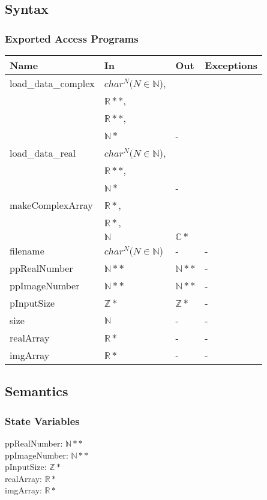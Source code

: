 \documentclass[12pt, titlepage]{article}
\begin{document}
\subsection{Syntax}

\subsubsection{Exported Access Programs}

\begin{center}
\begin{tabular}{p{3.5cm} p{4cm} p{4cm} p{2cm}}
\hline
\textbf{Name} & \textbf{In} & \textbf{Out} & \textbf{Exceptions} \\
\hline
load\_data\_complex & $char^{N}( N \in \mathbb{N}$),\\ &$\mathbb{R}**$,\\ &$\mathbb{R}**$, \\ &$\mathbb{N}*$ & - & \\
load\_data\_real &$char^{N}( N \in \mathbb{N}$),\\ &$\mathbb{R}**$, \\ &$\mathbb{N}*$ & - & \\
makeComplexArray&$\mathbb{R}*$,\\ &$\mathbb{R}*$,\\ &$\mathbb{N}$ 
&$\mathbb{C}*$&\\
filename&  $char^{N}( N \in \mathbb{N}$) & - & -\\
ppRealNumber&$\mathbb{N}**$ & $\mathbb{N}**$ & -\\
ppImageNumber&$\mathbb{N}**$&$\mathbb{N}**$ & -\\
pInputSize& $\mathbb{Z}*$&  $\mathbb{Z}*$&-\\
size&$\mathbb{N}$ & -& -\\
realArray&$\mathbb{R}*$&-& -\\
imgArray& $\mathbb{R}*$&-&-\\

\hline
\end{tabular}
\end{center}

\subsection{Semantics}

\subsubsection{State Variables}
ppRealNumber: $\mathbb{N}**$ \\
ppImageNumber: $\mathbb{N}**$\\
pInputSize: $\mathbb{Z}*$\\
realArray: $\mathbb{R}*$\\
imgArray: $\mathbb{R}*$\\
\end{document}
